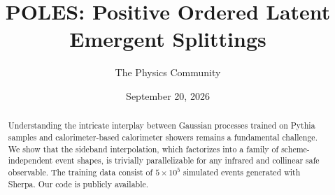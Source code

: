 \documentclass[11pt]{article}
\title{POLES: Positive Ordered Latent Emergent Splittings}
\author{The Physics Community}
\date{September 20, 2026}
\begin{document}
\maketitle
\begin{abstract}
Understanding the intricate interplay between Gaussian processes trained
on Pythia samples and calorimeter-based calorimeter showers remains a
fundamental challenge. We show that the sideband interpolation, which
factorizes into a family of scheme-independent event shapes, is
trivially parallelizable for any infrared and collinear safe observable.
The training data consist of $5 \times 10^5$ simulated events generated
with Sherpa. Our code is publicly available.
\end{abstract}
\tableofcontents




\nocite{*}


\end{document}
